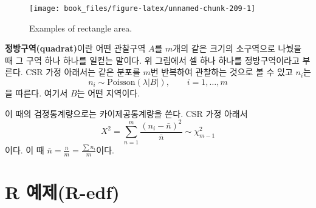 \documentclass[b5paper,]{scrbook}
\theoremstyle{plain}
\theoremstyle{definition}
\numberwithin{equation}{section}
\begin{document}
\begin{figure}

{\centering \texttt{[image: book\_files/figure-latex/unnamed-chunk-209-1]} 

}

\caption{Examples of rectangle area.}\label{fig:unnamed-chunk-209}
\end{figure}

\textbf{정방구역(quadrat)}이란 어떤 관찰구역 \(A\)를 \(m\)개의 같은
크기의 소구역으로 나눴을 때 그 구역 하나 하나를 일컫는 말이다. 위
그림에서 셀 하나 하나를 정방구역이라고 부른다. CSR 가정 아래서는 같은
분포를 \(m\)번 반복하여 관찰하는 것으로 볼 수 있고 \(n_{i}\)는
\[n_{i} \sim \text{Poisson}(\lambda |B|),\qquad{i=1,\ldots, m}\] 을
따른다. 여기서 \(B\)는 어떤 지역이다.

이 때의 검정통계량으로는 카이제공통계량을 쓴다. CSR 가정 아래서
\[X^{2}=\sum_{n=1}^{m}\frac{(n_{i}-\bar{n})^{2}}{\bar{n}} \sim \chi_{m-1}^{2}\]
이다. 이 때 \(\bar{n}=\frac{n}{m}=\frac{\sum n_{i}}{m}\)이다.

\section{R 예제(R-edf)}\label{r-r-edf}
\end{document}
